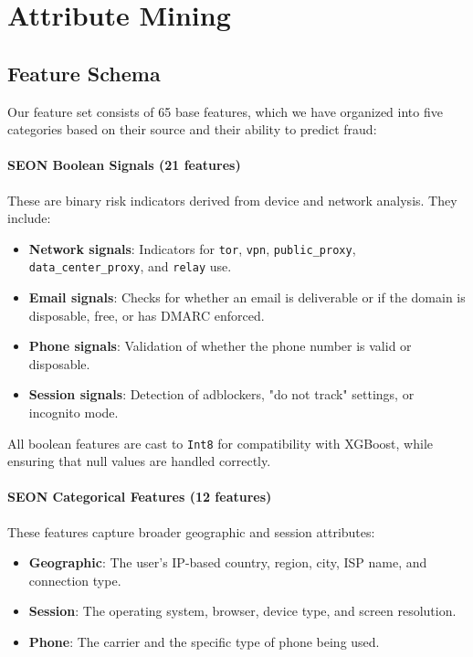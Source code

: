 \section{Attribute Mining}
\label{sec:3_4}

\subsection{Feature Schema}

Our feature set consists of 65 base features, which we have organized into five categories based on their source and their ability to predict fraud:

\paragraph{SEON Boolean Signals (21 features)}
These are binary risk indicators derived from device and network analysis. They include:
\begin{itemize}
    \item \textbf{Network signals}: Indicators for \texttt{tor}, \texttt{vpn}, \texttt{public\_proxy}, \texttt{data\_center\_proxy}, and \texttt{relay} use.
    \item \textbf{Email signals}: Checks for whether an email is deliverable or if the domain is disposable, free, or has DMARC enforced.
    \item \textbf{Phone signals}: Validation of whether the phone number is valid or disposable.
    \item \textbf{Session signals}: Detection of adblockers, "do not track" settings, or incognito mode.
\end{itemize}

All boolean features are cast to \texttt{Int8} for compatibility with XGBoost, while ensuring that null values are handled correctly.

\paragraph{SEON Categorical Features (12 features)}
These features capture broader geographic and session attributes:
\begin{itemize}
    \item \textbf{Geographic}: The user's IP-based country, region, city, ISP name, and connection type.
    \item \textbf{Session}: The operating system, browser, device type, and screen resolution.
    \item \textbf{Phone}: The carrier and the specific type of phone being used.
\end{itemize}

